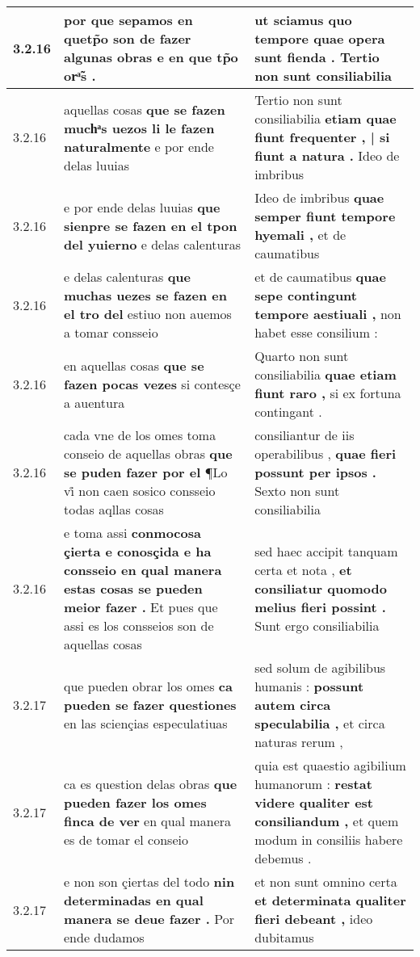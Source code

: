 \begin{tabular}{|p{1cm}|p{6.5cm}|p{6.5cm}|}
3.2.16 & por que sepamos en \textbf{ quetp̃o son de fazer algunas obras } e en que tp̃o orͣ̃s . & ut sciamus quo tempore \textbf{ quae opera sunt fienda . } Tertio non sunt consiliabilia \\\hline
3.2.16 & aquellas cosas \textbf{ que se fazen muchͣs uezos li le fazen naturalmente } e por ende delas luuias & Tertio non sunt consiliabilia \textbf{ etiam quae fiunt frequenter , | si fiunt a natura . } Ideo de imbribus \\\hline
3.2.16 & e por ende delas luuias \textbf{ que sienpre se fazen en el tpon del yuierno } e delas calenturas & Ideo de imbribus \textbf{ quae semper fiunt tempore hyemali , } et de caumatibus \\\hline
3.2.16 & e delas calenturas \textbf{ que muchas uezes se fazen en el tro del } estiuo non auemos a tomar consseio & et de caumatibus \textbf{ quae sepe contingunt tempore aestiuali , } non habet esse consilium : \\\hline
3.2.16 & en aquellas cosas \textbf{ que se fazen pocas vezes } si contesçe a auentura & Quarto non sunt consiliabilia \textbf{ quae etiam fiunt raro , } si ex fortuna contingant . \\\hline
3.2.16 & cada vne de los omes toma conseio de aquellas obras \textbf{ que se puden fazer por el } ¶Lo vi̊ non caen sosico consseio todas aqllas cosas & consiliantur de iis operabilibus , \textbf{ quae fieri possunt per ipsos . } Sexto non sunt consiliabilia \\\hline
3.2.16 & e toma assi \textbf{ conmocosa çierta e conosçida e ha consseio en qual manera estas cosas se pueden meior fazer . } Et pues que assi es los consseios son de aquellas cosas & sed haec accipit tanquam certa et nota , \textbf{ et consiliatur quomodo melius fieri possint . } Sunt ergo consiliabilia \\\hline
3.2.17 & que pueden obrar los omes \textbf{ ca pueden se fazer questiones } en las sciençias especulatiuas & sed solum de agibilibus humanis : \textbf{ possunt autem circa speculabilia , } et circa naturas rerum , \\\hline
3.2.17 & ca es question delas obras \textbf{ que pueden fazer los omes finca de ver } en qual manera es de tomar el conseio & quia est quaestio agibilium humanorum : \textbf{ restat videre qualiter est consiliandum , } et quem modum in consiliis habere debemus . \\\hline
3.2.17 & e non son çiertas del todo \textbf{ nin determinadas en qual manera se deue fazer . } Por ende dudamos & et non sunt omnino certa \textbf{ et determinata qualiter fieri debeant , } ideo dubitamus \\\hline

\end{tabular}
